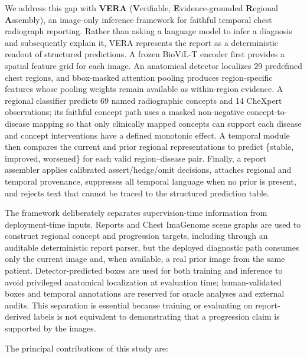 \documentclass[preprint,12pt]{elsarticle}
\begin{document}
We address this gap with \textbf{VERA} (\textbf{V}erifiable,
\textbf{E}vidence-grounded \textbf{R}egional \textbf{A}ssembly), an image-only
inference framework for faithful temporal chest radiograph reporting. Rather
than asking a language model to infer a diagnosis and subsequently explain it,
VERA represents the report as a deterministic readout of structured predictions.
A frozen BioViL-T encoder first provides a spatial feature grid for each image.
An anatomical detector localizes 29 predefined chest regions, and bbox-masked
attention pooling produces region-specific features whose pooling weights remain
available as within-region evidence. A regional classifier predicts 69 named
radiographic concepts and 14 CheXpert observations; its faithful concept path
uses a masked non-negative concept-to-disease mapping so that only clinically
mapped concepts can support each disease and concept interventions have a
defined monotonic effect. A temporal module then compares the current and prior
regional representations to predict \{stable, improved, worsened\} for each
valid region--disease pair. Finally, a report assembler applies calibrated
assert/hedge/omit decisions, attaches regional and temporal provenance, suppresses
all temporal language when no prior is present, and rejects text that cannot be
traced to the structured prediction table.

The framework deliberately separates supervision-time information from
deployment-time inputs. Reports and Chest ImaGenome scene graphs are used to
construct regional concept and progression targets, including through an
auditable deterministic report parser, but the deployed diagnostic path consumes
only the current image and, when available, a real prior image from the same
patient. Detector-predicted boxes are used for both training and inference to
avoid privileged anatomical localization at evaluation time; human-validated
boxes and temporal annotations are reserved for oracle analyses and external
audits. This separation is essential because training or evaluating on
report-derived labels is not equivalent to demonstrating that a progression
claim is supported by the images.

The principal contributions of this study are:
\end{document}
